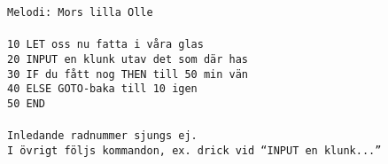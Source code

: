 {\small{\scriptsize\texttt{Melodi: Mors lilla Olle}}\\
\\
\texttt{10 LET oss nu fatta i våra glas}\\
\texttt{20 INPUT en klunk utav det som där has}\\
\texttt{30 IF du fått nog THEN till 50 min vän}\\
\texttt{40 ELSE GOTO-baka till 10 igen}\\
\texttt{50 END}\\
\\
{\scriptsize\texttt{Inledande radnummer sjungs ej.\\ I övrigt följs
    kommandon, ex. drick vid ``INPUT en klunk...''}}}
